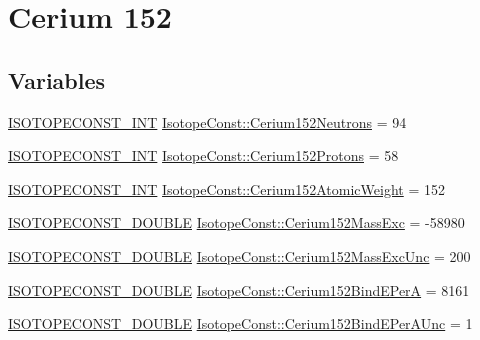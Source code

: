 \hypertarget{group___isotope_const-_cerium-_ce152}{}\section{Cerium 152}
\label{group___isotope_const-_cerium-_ce152}
\subsection*{Variables}
\begin{DoxyCompactItemize}
\item 
\mbox{\hyperlink{group___isotope_const-_macros_ga5f18360b3e99483a35c32d789e62621c}{I\+S\+O\+T\+O\+P\+E\+C\+O\+N\+S\+T\+\_\+\+I\+NT}} \mbox{\hyperlink{group___isotope_const-_cerium-_ce152_gadaa6d29b34346c4f5bbf1a5eb7495832}{Isotope\+Const\+::\+Cerium152\+Neutrons}} = 94
\item 
\mbox{\hyperlink{group___isotope_const-_macros_ga5f18360b3e99483a35c32d789e62621c}{I\+S\+O\+T\+O\+P\+E\+C\+O\+N\+S\+T\+\_\+\+I\+NT}} \mbox{\hyperlink{group___isotope_const-_cerium-_ce152_gaf543d4c42a113fc2ee9cfef3d454430c}{Isotope\+Const\+::\+Cerium152\+Protons}} = 58
\item 
\mbox{\hyperlink{group___isotope_const-_macros_ga5f18360b3e99483a35c32d789e62621c}{I\+S\+O\+T\+O\+P\+E\+C\+O\+N\+S\+T\+\_\+\+I\+NT}} \mbox{\hyperlink{group___isotope_const-_cerium-_ce152_ga17d275da03c11ea3ee2d3a334a4b6ee8}{Isotope\+Const\+::\+Cerium152\+Atomic\+Weight}} = 152
\item 
\mbox{\hyperlink{group___isotope_const-_macros_ga8f45a7272ce02c0b4c65c44636ed719a}{I\+S\+O\+T\+O\+P\+E\+C\+O\+N\+S\+T\+\_\+\+D\+O\+U\+B\+LE}} \mbox{\hyperlink{group___isotope_const-_cerium-_ce152_ga4cd1bf34443ce56754e8dd567d2f6b6c}{Isotope\+Const\+::\+Cerium152\+Mass\+Exc}} = -\/58980
\item 
\mbox{\hyperlink{group___isotope_const-_macros_ga8f45a7272ce02c0b4c65c44636ed719a}{I\+S\+O\+T\+O\+P\+E\+C\+O\+N\+S\+T\+\_\+\+D\+O\+U\+B\+LE}} \mbox{\hyperlink{group___isotope_const-_cerium-_ce152_ga3e8a21c7103a2a661f1b55b67bcbd245}{Isotope\+Const\+::\+Cerium152\+Mass\+Exc\+Unc}} = 200
\item 
\mbox{\hyperlink{group___isotope_const-_macros_ga8f45a7272ce02c0b4c65c44636ed719a}{I\+S\+O\+T\+O\+P\+E\+C\+O\+N\+S\+T\+\_\+\+D\+O\+U\+B\+LE}} \mbox{\hyperlink{group___isotope_const-_cerium-_ce152_ga1a786b8c427e151a3aa86f6d7a53a8a0}{Isotope\+Const\+::\+Cerium152\+Bind\+E\+PerA}} = 8161
\item 
\mbox{\hyperlink{group___isotope_const-_macros_ga8f45a7272ce02c0b4c65c44636ed719a}{I\+S\+O\+T\+O\+P\+E\+C\+O\+N\+S\+T\+\_\+\+D\+O\+U\+B\+LE}} \mbox{\hyperlink{group___isotope_const-_cerium-_ce152_ga3394ef879de794731e12bc66905b7807}{Isotope\+Const\+::\+Cerium152\+Bind\+E\+Per\+A\+Unc}} = 1

\end{DoxyCompactItemize}
